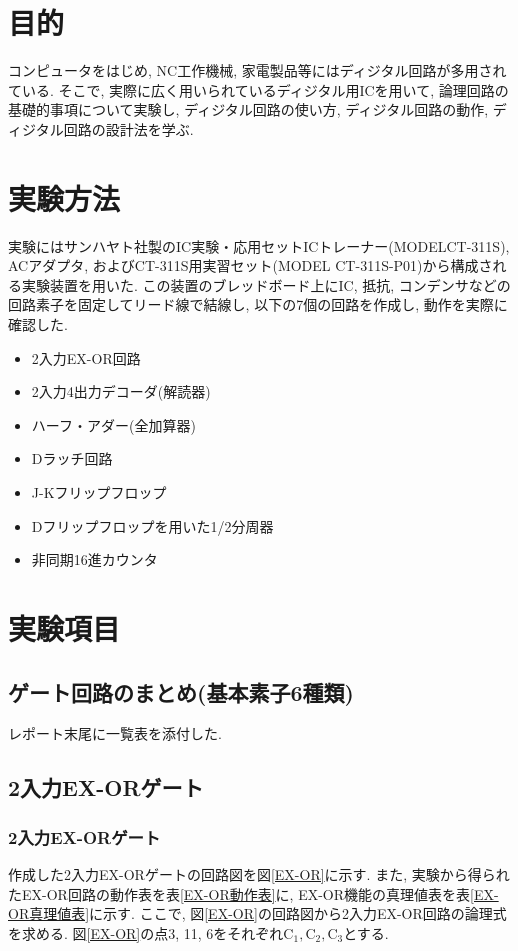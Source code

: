 \documentclass[a4paper, 11pt, uplatex]{jsarticle}
\begin{document}
\section{目的}
コンピュータをはじめ, NC工作機械, 家電製品等にはディジタル回路が多用されている.
そこで, 実際に広く用いられているディジタル用ICを用いて, 論理回路の基礎的事項について実験し, ディジタル回路の使い方,
ディジタル回路の動作, ディジタル回路の設計法を学ぶ.
\section{実験方法}
実験にはサンハヤト社製のIC実験・応用セットICトレーナー(MODELCT-311S),
ACアダプタ, およびCT-311S用実習セット(MODEL  CT-311S-P01)から構成される実験装置を用いた.
この装置のブレッドボード上にIC, 抵抗, コンデンサなどの回路素子を固定してリード線で結線し,
以下の7個の回路を作成し,  動作を実際に確認した.
\begin{itemize}
  \item 2入力EX-OR回路
  \item 2入力4出力デコーダ(解読器)
  \item ハーフ・アダー(全加算器)
  \item Dラッチ回路
  \item J-Kフリップフロップ
  \item Dフリップフロップを用いた1/2分周器
  \item 非同期16進カウンタ
\end{itemize}

\section{実験項目}
\subsection{ゲート回路のまとめ(基本素子6種類)}
レポート末尾に一覧表を添付した.
\subsection{2入力EX-ORゲート}
\subsubsection{2入力EX-ORゲート}

作成した2入力EX-ORゲートの回路図を図\ref{EX-OR}に示す.
また,  実験から得られたEX-OR回路の動作表を表\ref{EX-OR動作表}に,  EX-OR機能の真理値表を表\ref{EX-OR真理値表}に示す.
ここで, 図\ref{EX-OR}の回路図から2入力EX-OR回路の論理式を求める.
図\ref{EX-OR}の点3, 11, 6をそれぞれ$\mathrm{C_1}, \mathrm{C_2}, \mathrm{C_3}$とする.
\end{document}
